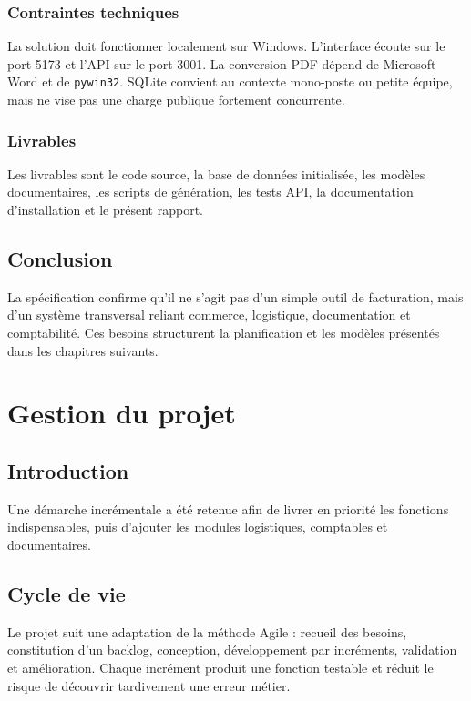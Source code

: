 \documentclass[12pt,a4paper,oneside]{report}
\newcommand{\code}[1]{\texttt{#1}}
\begin{document}
\subsection{Contraintes techniques}
La solution doit fonctionner localement sur Windows. L'interface écoute sur le port 5173 et l'API sur le port 3001. La conversion PDF dépend de Microsoft Word et de \code{pywin32}. SQLite convient au contexte mono-poste ou petite équipe, mais ne vise pas une charge publique fortement concurrente.

\subsection{Livrables}
Les livrables sont le code source, la base de données initialisée, les modèles documentaires, les scripts de génération, les tests API, la documentation d'installation et le présent rapport.

\section*{Conclusion}
La spécification confirme qu'il ne s'agit pas d'un simple outil de facturation, mais d'un système transversal reliant commerce, logistique, documentation et comptabilité. Ces besoins structurent la planification et les modèles présentés dans les chapitres suivants.

\chapter{Gestion du projet}
\section*{Introduction}
Une démarche incrémentale a été retenue afin de livrer en priorité les fonctions indispensables, puis d'ajouter les modules logistiques, comptables et documentaires.

\section{Cycle de vie}
Le projet suit une adaptation de la méthode Agile : recueil des besoins, constitution d'un backlog, conception, développement par incréments, validation et amélioration. Chaque incrément produit une fonction testable et réduit le risque de découvrir tardivement une erreur métier.
\end{document}
